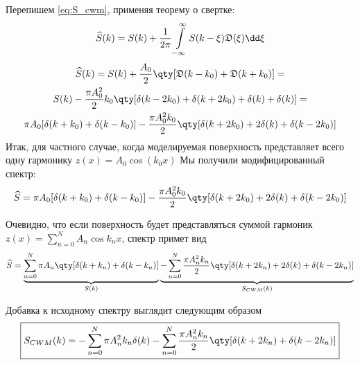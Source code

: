  Перепишем \eqref{eq:S_cwm}, применяя теорему о свертке:
\begin{equation}
    \widehat S(k) = S(k) +
    \frac{1}{2\pi} \int\limits_{-\infty}^{\infty} S(k-\xi) \D(\xi) \dd \xi 
\end{equation}
\begin{gather}
    \widehat S(k) = S(k) + \frac{A_{0}}{2} \qty[\D(k-k_{0}) + \D(k+k_{0})] = \\
    S(k) - \frac{\pi A_{0}^2}{2} k_{0} \qty[
    \delta(k-2k_{0}) +
    \delta(k+2k_{0}) +
    \delta(k) +
    \delta(k) 
    ] = \\
    \pi A_{0}[\delta(k+k_{0})+ \delta(k-k_{0})] -
    \frac{\pi A_{0}^2k_{0}}{2}\qty[ \delta(k+2k_{0}) + 2\delta(k) +
    \delta(k-2k_{0})]
\end{gather}
Итак, для частного случае, когда моделируемая поверхность представляет всего
одну гармонику $z(x) = A_{0}\cos(k_{0}x)$
Мы получили модифицированный спектр:
\begin{equation}
    \widehat S = 
    \pi A_{0}[\delta(k+k_{0})+ \delta(k-k_{0})] -
    \frac{\pi A_{0}^2k_{0}}{2}\qty[ \delta(k+2k_{0}) + 2\delta(k) +
    \delta(k-2k_{0})]
\end{equation}

Очевидно, что если поверхность будет представляться суммой гармоник
$z(x) = \sum\limits_{n=0}^{N} A_n \cos{k_n x}$,
спектр примет вид
\begin{equation}
    \widehat S = 
    \underbrace{
    \sum\limits_{n=0}^{N} \pi A_n \qty[\delta(k+k_n) + \delta(k-k_n) ]
}_{S(k)}
\underbrace{
- \sum\limits_{n=0}^{N} \frac{\pi A_{n}^2 k_n}{2}
\qty[ \delta(k+2k_{n}) 
    + 2\delta(k) 
+ \delta(k-2k_{n})]
}_{S_{CWM}(k)}
\end{equation}

Добавка к исходному спектру выглядит следующим образом
\begin{gather}
    \boxed{
    S_{CWM}(k) = - \sum\limits_{n=0}^{N} \pi A_{n}^2 k_n \delta(k) - 
    \sum\limits_{n=0}^{N} \frac{\pi A_n^2 k_n}{2} \qty[\delta(k+2k_n) +
    \delta(k-2k_n)]
}
\end{gather}

